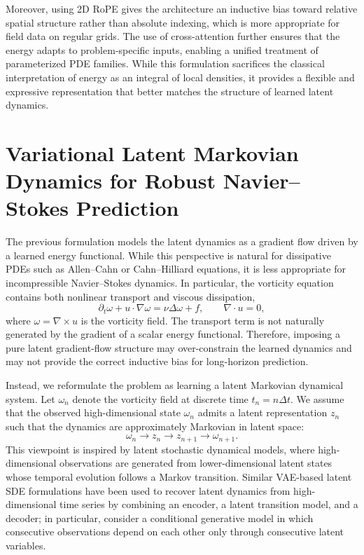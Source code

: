 \documentclass[11pt]{article}
\begin{document}
Moreover, using 2D RoPE gives the architecture an inductive bias toward relative spatial structure rather than absolute indexing, which is more appropriate for field data on regular grids. The use of cross-attention further ensures that the energy adapts to problem-specific inputs, enabling a unified treatment of parameterized PDE families. While this formulation sacrifices the classical interpretation of energy as an integral of local densities, it provides a flexible and expressive representation that better matches the structure of learned latent dynamics.
\fi

\section{Variational Latent Markovian Dynamics for Robust Navier--Stokes Prediction}

The previous formulation models the latent dynamics as a gradient flow driven by a learned energy functional. While this perspective is natural for dissipative PDEs such as Allen--Cahn or Cahn--Hilliard equations, it is less appropriate for incompressible Navier--Stokes dynamics. In particular, the vorticity equation contains both nonlinear transport and viscous dissipation,
\begin{equation}
    \partial_t \omega + u\cdot \nabla \omega
    =
    \nu \Delta \omega + f,
    \qquad
    \nabla\cdot u=0,
\end{equation}
where $\omega=\nabla\times u$ is the vorticity field. The transport term is not naturally generated by the gradient of a scalar energy functional. Therefore, imposing a pure latent gradient-flow structure may over-constrain the learned dynamics and may not provide the correct inductive bias for long-horizon prediction.

Instead, we reformulate the problem as learning a latent Markovian dynamical system. Let $\omega_n$ denote the vorticity field at discrete time $t_n=n\Delta t$. We assume that the observed high-dimensional state $\omega_n$ admits a latent representation $z_n$ such that the dynamics are approximately Markovian in latent space:
\begin{equation}
    \omega_n \longrightarrow z_n \longrightarrow z_{n+1} \longrightarrow \omega_{n+1}.
\end{equation}
This viewpoint is inspired by latent stochastic dynamical models, where high-dimensional observations are generated from lower-dimensional latent states whose temporal evolution follows a Markov transition. Similar VAE-based latent SDE formulations have been used to recover latent dynamics from high-dimensional time series by combining an encoder, a latent transition model, and a decoder; in particular, \cite{hasan2021identifying} consider a conditional generative model in which consecutive observations depend on each other only through consecutive latent variables. 
\end{document}
